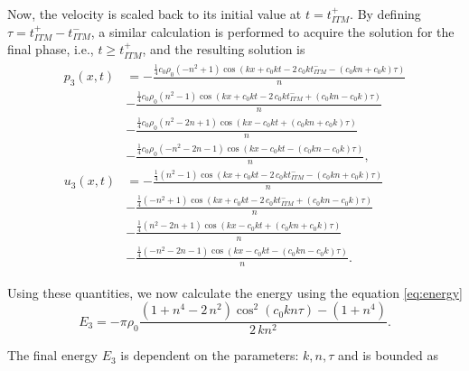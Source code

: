 Now, the velocity is scaled back to its initial value at $t=t_{ITM}^+$. By defining $\tau = t_{ITM}^+ - t_{ITM}^-$, a similar calculation is performed to acquire the
solution for the final phase, i.e., $t \geq t_{ITM}^+$, and the resulting solution is
\begingroup
\allowdisplaybreaks
\begin{align}
    \begin{split}
        p_3\left(x, t\right) & = -\frac{{\frac{1}{4}c_{0}\rho_{0}\left( -n^{2} + 1\right)} \cos\left(k x + c_{0} k t - 2 \, c_{0} k \mathit{t_{ITM}^-} - {\left(c_{0} k n + c_{0} k\right)} \tau\right)}{n} \\
        & - \frac{{\frac{1}{4}c_0\rho_0\left(n^{2} - 1\right)} \cos\left(k x + c_{0} k t - 2 \, c_{0} k \mathit{t_{ITM}^-} + {\left(c_{0} k n - c_{0} k\right)} \tau\right)}{n} \\
        & - \frac{{\frac{1}{4}c_0\rho_0\left(n^{2} - 2n + 1\right)} \cos\left(kx -c_{0} k t + {\left(c_{0} k n + c_{0} k\right)} \tau\right)}{n} \\
        & - \frac{{\frac{1}{4}c_0\rho_0\left(-n^{2} - 2n - 1\right)} \cos\left(kx-c_{0} k t - {\left(c_{0} k n - c_{0} k\right)} \tau\right)}{n}, \\
        u_3\left(x, t\right) & =  -\frac{{\frac{1}{4}\left(n^{2} - 1\right)} \cos\left( k x + c_{0} k t - 2 \, c_{0} k \mathit{t_{ITM}^-} - {\left(c_{0} k n + c_{0} k\right)} \tau\right)}{n} \\
        & - \frac{{\frac{1}{4}\left(-n^{2} + 1\right)} \cos\left(kx + c_{0} k t - 2 \, c_{0} k \mathit{t_{ITM}^-} + {\left(c_{0} k n - c_{0} k\right)} \tau\right)}{n} \\
        & - \frac{{\frac{1}{4}\left(n^{2} - 2n + 1\right)} \cos\left(kx -c_{0} k t + {\left(c_{0} k n + c_{0} k\right)} \tau\right)}{n} \\
        & - \frac{{\frac{1}{4}\left(-n^{2} - 2n - 1\right)} \cos\left(kx -c_{0} k t - {\left(c_{0} k n - c_{0} k\right)} \tau\right)}{n} .
    \end{split}
\end{align}
\endgroup

Using these quantities, we now calculate the energy using the equation \ref{eq:energy}
\begin{equation}
    E_3 = -\pi \rho_0\frac{{\left(1 + n^{4} - 2 \, n^{2}\right)} \cos^{2}\left(c_{0} k n \tau\right) - {\left(1 + n^{4}\right)}}{2 \, k n^{2}}.
\end{equation}

The final energy $E_3$ is dependent on the parameters: $k, n, \tau$ and is bounded as

